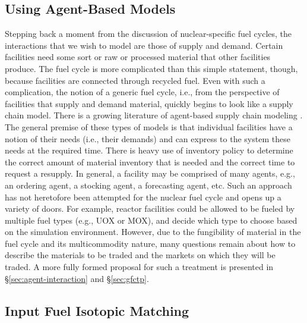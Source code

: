 \subsection{Using Agent-Based Models}

Stepping back a moment from the discussion of nuclear-specific fuel cycles, the
interactions that we wish to model are those of supply and demand. Certain
facilities need some sort or raw or processed material that other facilities
produce. The fuel cycle is more complicated than this simple statement, though,
because facilities are connected through recycled fuel. Even with such a
complication, the notion of a generic fuel cycle, i.e., from the perspective of
facilities that supply and demand material, quickly begins to look like a supply
chain model. There is a growing literature of agent-based supply chain modeling
\cite{swaminathan_modeling_1998,julka_agent-based_2002,van_der_zee_modeling_2005,chatfield_multi-formalism_2007,holmgren_agent_2007}.
The general premise of these types of models is that individual facilities have
a notion of their needs (i.e., their demands) and can express to the system
these needs at the required time. There is heavy use of inventory policy to
determine the correct amount of material inventory that is needed and the
correct time to request a resupply. In general, a facility may be comprised of
many agents, e.g., an ordering agent, a stocking agent, a forecasting agent,
etc. Such an approach has not heretofore been attempted for the nuclear fuel
cycle and opens up a variety of doors. For example, reactor facilities could be
allowed to be fueled by multiple fuel types (e.g., UOX or MOX), and decide which
type to choose based on the simulation environment. However, due to the
fungibility of material in the fuel cycle and its multicommodity nature, many
questions remain about how to describe the materials to be traded and the
markets on which they will be traded. A more fully formed proposal for such a
treatment is presented in \S\ref{sec:agent-interaction} and \S\ref{sec:gfctp}.

\subsection{Input Fuel Isotopic Matching}

